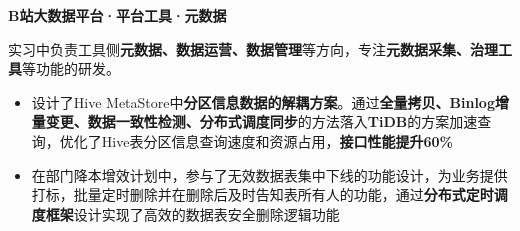\documentclass{resume}
\begin{document}
  \textbf{B站大数据平台·平台工具·元数据}
\begin{spacing}{1.2} 
  实习中负责工具侧\textbf{元数据、数据运营、数据管理}等方向，专注\textbf{元数据采集、治理工具}等功能的研发。

  \begin{itemize}
    \item 设计了Hive MetaStore中\textbf{分区信息数据的解耦方案}。通过\textbf{全量拷贝、Binlog增量变更、数据一致性检测、分布式调度同步}的方法落入\textbf{TiDB}的方案加速查询，优化了Hive表分区信息查询速度和资源占用，\textbf{接口性能提升60\%}
    \item 在部门降本增效计划中，参与了无效数据表集中下线的功能设计，为业务提供打标，批量定时删除并在删除后及时告知表所有人的功能，通过\textbf{分布式定时调度框架}设计实现了高效的数据表安全删除逻辑功能
  \end{itemize}
  \end{spacing} 

    

\end{document}
